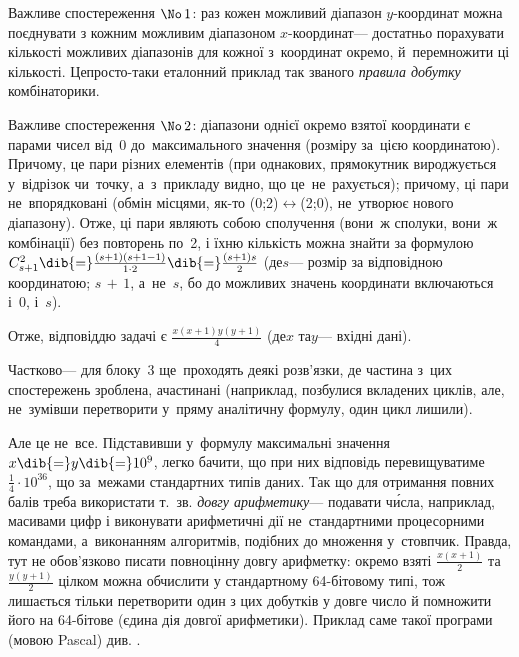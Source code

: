  Важливе спостереження $\No\,1$:
раз кожен можливий діапазон $y$-коор\-ди\-нат можна поєднувати з 
кожним можливим діапазоном $x$-коор\-ди\-нат\nolinebreak[3] --- 
достатньо порахувати кількості можливих діапазонів для кожної з~координат окремо,
й~перемножити ці кількості.
Це\nolinebreak[3] просто-таки еталонний приклад так званого \emph{правила добутку} комбінаторики.

Важливе спостереження $\No\,2$: %
діапазони однієї окремо взятої координати 
є парами чисел від~0 до~максимального значення (розміру за~цією координатою).
Причому, це пари різних елементів (при однакових, прямокутник вироджується у~відрізок чи~точку, 
а~з~прикладу видно, що це~не~рахується); 
причому, ці пари не~впорядковані (обмін місцями, як-то (0;2)$\leftrightarrow$(2;0), не~утворює нового діапазону).
Отже, ці пари являють собою сполучення (вони~ж сполуки, вони~ж комбінації) без повторень по~2,
і їхню кількість можна знайти за формулою 
$C_{s+1}^{2}\dib{{=}}\frac{(s+1)(s+1-1)}{1\cdot2}\dib{{=}}\frac{(s+1)s}{2}$ 
(де\nolinebreak[3] $s$\nolinebreak[3] --- розмір за відповідною координатою; 
${s\,{+}\,1}$, а~не~$s$, бо до можливих значень координати включаються і~0, і~$s$).

Отже, відповіддю задачі є $\displaystyle\frac{x(x+1)y(y+1)}{4}$ 
(де\nolinebreak[3] $x$ та\nolinebreak[3] $y$\nolinebreak[3] --- вхідні дані).

  Частково\nolinebreak[3] --- 
для блоку~3 ще~проходять 
деякі розв'язки, 
де частина з~цих %
спостережень зроблена, а\nolinebreak[3] частина\nolinebreak[3] ні 
(наприклад, позбулися вкладених циклів, 
але, не~зумівши перетворити %
у~пряму аналітичну формулу, один цикл лишили).

Але це не~все. 
Підставивши у~формулу %
максимальні значення 
$x\dib{{=}}y\dib{{=}}10^9$,
легко бачити, що при них відповідь перевищуватиме $\frac{1}{4}\cdot10^{36}$, 
що за~межами %
стандартних типів даних.
Так що для отримання повних балів %
треба використати 
т.~зв. \emph{довгу арифметику}\nolinebreak[3] --- 
подавати ч\'{и}сла, наприклад, масивами цифр 
і виконувати арифметичні дії не~стандартними процесорними командами,
а~виконанням алгоритмів, подібних до %
множення у~стовпчик.
Правда, тут не обов'язково писати повноцінну довгу арифметку:
окремо взяті $\frac{x(x+1)}{2}$ та $\frac{y(y+1)}{2}$ цілком можна обчислити у стандартному 64-бітовому типі, тож лишається тільки перетворити один з цих добутків у довге число 
й помножити його на 64-бітове 
(єдина дія довгої арифметики).
Приклад саме такої програми (мовою Pascal) див. .


